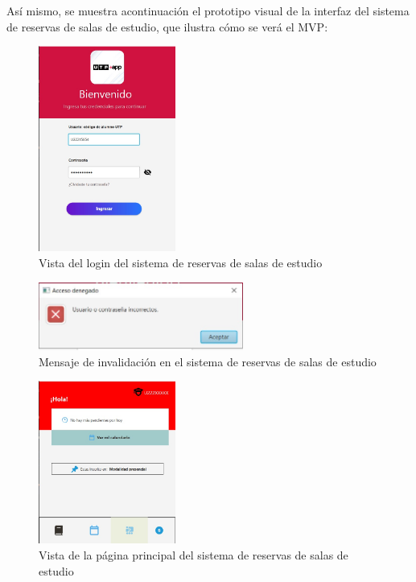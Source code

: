 \documentclass{article}
\begin{document}
      Así mismo, se muestra acontinuación el prototipo visual de la interfaz del sistema de reservas de salas de estudio, que ilustra cómo se verá el MVP:
      \begin{figure}[H]
         \centering
         \includegraphics[width=0.4\textwidth]{assets/login.jpeg}
         \caption{Vista del login del sistema de reservas de salas de estudio}
         \label{fig:prototipo}
       \end{figure}
      \newpage

      \begin{figure}[H]
      \centering
      \includegraphics[width=0.6\textwidth]{assets/invalidacion.jpeg}
      \caption{Mensaje de invalidación en el sistema de reservas de salas de estudio}
      \label{fig:invalidacion}
      \end{figure}

      \begin{figure}[H]
      \centering
      \includegraphics[width=0.4\textwidth]{assets/principal.jpeg}
      \caption{Vista de la página principal del sistema de reservas de salas de estudio}
      \label{fig:homepage}
      \end{figure}
\end{document}
